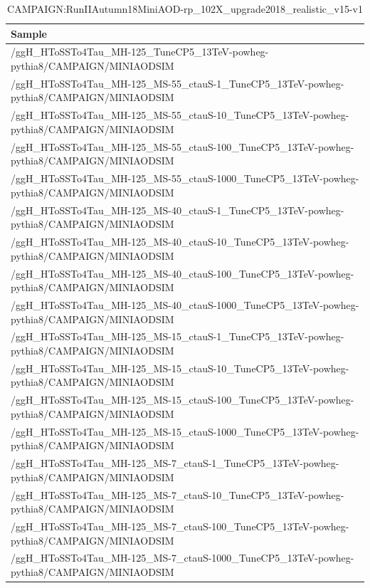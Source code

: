 \begin{table}[htb]
  \begin{center}
    \scriptsize
    \begin{tabular}{l}\hline
      Sample \\
      \hline
      /ggH\_HToSSTo4Tau\_MH-125\_TuneCP5\_13TeV-powheg-pythia8/CAMPAIGN/MINIAODSIM\\
      \hline
      /ggH\_HToSSTo4Tau\_MH-125\_MS-55\_ctauS-1\_TuneCP5\_13TeV-powheg-pythia8/CAMPAIGN/MINIAODSIM\\
      /ggH\_HToSSTo4Tau\_MH-125\_MS-55\_ctauS-10\_TuneCP5\_13TeV-powheg-pythia8/CAMPAIGN/MINIAODSIM\\
      /ggH\_HToSSTo4Tau\_MH-125\_MS-55\_ctauS-100\_TuneCP5\_13TeV-powheg-pythia8/CAMPAIGN/MINIAODSIM\\
      /ggH\_HToSSTo4Tau\_MH-125\_MS-55\_ctauS-1000\_TuneCP5\_13TeV-powheg-pythia8/CAMPAIGN/MINIAODSIM\\
      /ggH\_HToSSTo4Tau\_MH-125\_MS-40\_ctauS-1\_TuneCP5\_13TeV-powheg-pythia8/CAMPAIGN/MINIAODSIM\\
      /ggH\_HToSSTo4Tau\_MH-125\_MS-40\_ctauS-10\_TuneCP5\_13TeV-powheg-pythia8/CAMPAIGN/MINIAODSIM\\
      /ggH\_HToSSTo4Tau\_MH-125\_MS-40\_ctauS-100\_TuneCP5\_13TeV-powheg-pythia8/CAMPAIGN/MINIAODSIM\\
      /ggH\_HToSSTo4Tau\_MH-125\_MS-40\_ctauS-1000\_TuneCP5\_13TeV-powheg-pythia8/CAMPAIGN/MINIAODSIM\\
      /ggH\_HToSSTo4Tau\_MH-125\_MS-15\_ctauS-1\_TuneCP5\_13TeV-powheg-pythia8/CAMPAIGN/MINIAODSIM\\
      /ggH\_HToSSTo4Tau\_MH-125\_MS-15\_ctauS-10\_TuneCP5\_13TeV-powheg-pythia8/CAMPAIGN/MINIAODSIM\\
      /ggH\_HToSSTo4Tau\_MH-125\_MS-15\_ctauS-100\_TuneCP5\_13TeV-powheg-pythia8/CAMPAIGN/MINIAODSIM\\
      /ggH\_HToSSTo4Tau\_MH-125\_MS-15\_ctauS-1000\_TuneCP5\_13TeV-powheg-pythia8/CAMPAIGN/MINIAODSIM\\
      /ggH\_HToSSTo4Tau\_MH-125\_MS-7\_ctauS-1\_TuneCP5\_13TeV-powheg-pythia8/CAMPAIGN/MINIAODSIM\\
      /ggH\_HToSSTo4Tau\_MH-125\_MS-7\_ctauS-10\_TuneCP5\_13TeV-powheg-pythia8/CAMPAIGN/MINIAODSIM\\
      /ggH\_HToSSTo4Tau\_MH-125\_MS-7\_ctauS-100\_TuneCP5\_13TeV-powheg-pythia8/CAMPAIGN/MINIAODSIM\\
      /ggH\_HToSSTo4Tau\_MH-125\_MS-7\_ctauS-1000\_TuneCP5\_13TeV-powheg-pythia8/CAMPAIGN/MINIAODSIM\\
      \hline
    \end{tabular}
    \label{tab:sigsample}
  \end{center}
  \caption{CAMPAIGN:RunIIAutumn18MiniAOD-rp\_102X\_upgrade2018\_realistic\_v15-v1}
\end{table}




